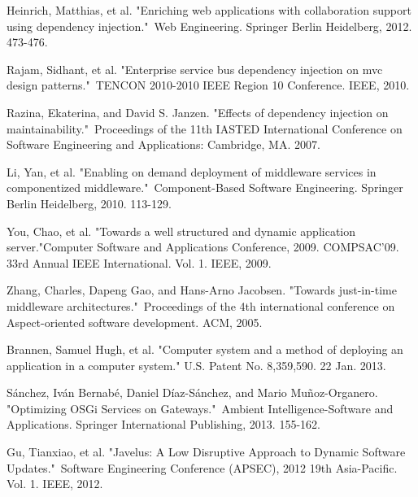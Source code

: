 \documentclass[conference]{IEEEtran}
\begin{document}
\begin{thebibliography}{9}
Heinrich, Matthias, et al. "Enriching web applications with collaboration support using dependency injection." Web Engineering. Springer Berlin Heidelberg, 2012. 473-476.

Rajam, Sidhant, et al. "Enterprise service bus dependency injection on mvc design patterns." TENCON 2010-2010 IEEE Region 10 Conference. IEEE, 2010.

Razina, Ekaterina, and David S. Janzen. "Effects of dependency injection on maintainability." Proceedings of the 11th IASTED International Conference on Software Engineering and Applications: Cambridge, MA. 2007.

Li, Yan, et al. "Enabling on demand deployment of middleware services in componentized middleware." Component-Based Software Engineering. Springer Berlin Heidelberg, 2010. 113-129.

You, Chao, et al. "Towards a well structured and dynamic application server."Computer Software and Applications Conference, 2009. COMPSAC'09. 33rd Annual IEEE International. Vol. 1. IEEE, 2009.

Zhang, Charles, Dapeng Gao, and Hans-Arno Jacobsen. "Towards just-in-time middleware architectures." Proceedings of the 4th international conference on Aspect-oriented software development. ACM, 2005.

Brannen, Samuel Hugh, et al. "Computer system and a method of deploying an application in a computer system." U.S. Patent No. 8,359,590. 22 Jan. 2013.

Sánchez, Iván Bernabé, Daniel Díaz-Sánchez, and Mario Muñoz-Organero. "Optimizing OSGi Services on Gateways." Ambient Intelligence-Software and Applications. Springer International Publishing, 2013. 155-162.

Gu, Tianxiao, et al. "Javelus: A Low Disruptive Approach to Dynamic Software Updates." Software Engineering Conference (APSEC), 2012 19th Asia-Pacific. Vol. 1. IEEE, 2012.

\end{thebibliography}



\end{document}
